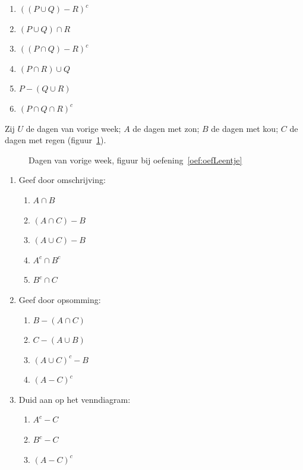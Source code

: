 \begin{oef}
\begin{opl}
\begin{enumerate}
\item $\left(\left(P\cup Q\right)-R\right)^c$
\item $\left(P\cup Q\right) \cap R$
\item $\left(\left(P\cap Q\right)-R\right)^c$
\item $(P\cap R)\cup Q$
\item $P-(Q\cup R)$
\item $(P\cap Q \cap R)^c$
\end{enumerate}
\end{opl}
\end{oef}



\newpage
\begin{oef}
\label{oef:oefLeentje}
%
Zij $U$ de dagen van vorige week; $A$ de dagen met zon; $B$ de dagen met kou; $C$ de dagen met regen (figuur~\ref{fig:dagen}).
\begin{figure}[htbp]
\centering

\caption{Dagen van vorige week, figuur bij oefening~\ref{oef:oefLeentje}}
\label{fig:dagen}
\end{figure}
\begin{enumerate}
\item	Geef door omschrijving:
\begin{enumerate}
\item $A\cap B$
\item $(A\cap C)-B$
\item $(A\cup C)-B$
\item $A^c\cap B^c$
\item $B^c\cap C$
\end{enumerate}
\item Geef door opsomming:
\begin{enumerate}
\item $B-(A\cap C)$
\item $C-(A\cup B)$
\item $(A\cup C)^c-B$
\item $(A-C)^c$
\end{enumerate}
\item Duid aan op het venndiagram:
\begin{enumerate}
\item $A^c-C$
\item $B^c -C$
\item $(A-C)^c$
\end{enumerate}
\end{enumerate}


\end{oef}
